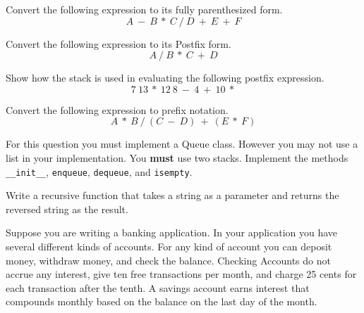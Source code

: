 \documentclass[11pt]{exam}
\begin{document}
\begin{questions}

\question[5] Convert the following expression to its fully parenthesized form. 
$$A~-~B~*~C~/~D~+~E~+~F$$
\vspace{1.5in}

\question[5] Convert the following expression to its Postfix form.  
$$A~/~B~*~C~+~D$$
\vspace{1.5in}

\question[5] Show how the stack is used in evaluating the following postfix expression.
$$7~13~*~12~8~-~4~+~10~*$$
\vspace{1.5in}

\question[5] Convert the following expression to prefix notation. 
$$A~*~B~/~(C~-~D)~+~(E~*~F)$$
\vspace{1.5in}

\question[20] For this question you must implement a Queue class.  However you may not use a list in your implementation.  You \textbf{must} use two stacks.  Implement the methods \verb!__init__!, \texttt{enqueue}, \texttt{dequeue}, and \texttt{isempty}.
\vspace{4.5in}

\newpage
\question Write a recursive function that takes a string as a parameter and returns the reversed string as the result.  

\newpage
\question Suppose you are writing a banking application.  In your application you have several different kinds of accounts.  For any kind of account you can deposit money, withdraw money, and check the balance.    Checking Accounts do not accrue any interest, give ten free transactions per month, and charge 25 cents for each transaction after the tenth.  A savings account earns interest that compounds monthly based on the balance on the last day of the month.


\end{questions}
\end{document}
